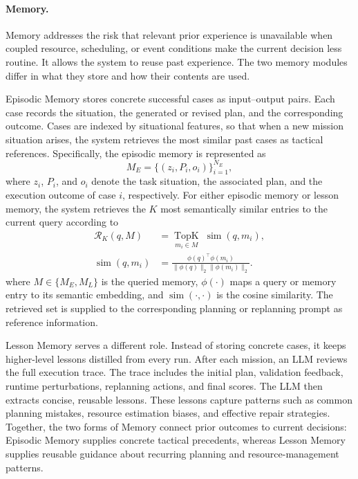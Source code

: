 \paragraph{Memory.} Memory addresses the risk that relevant prior experience is
unavailable when coupled resource, scheduling, or event conditions make the
current decision less routine. It allows the system to reuse past experience.
The two memory modules differ in what they store and how their contents are
used.

Episodic Memory stores concrete successful cases as input--output pairs.
Each case records the situation, the generated or revised plan,
and the corresponding outcome.
Cases are indexed by situational features, so that when a new mission situation arises,
the system retrieves the most similar past cases as tactical references.
Specifically, the episodic memory is represented as
\begin{equation}
M_E=\{(z_i,P_i,o_i)\}_{i=1}^{N_E},
\label{eq:episodic-memory}
\end{equation}
where $z_i$, $P_i$, and $o_i$ denote the task situation, the associated plan,
and the execution outcome of case $i$, respectively. For either episodic
memory or lesson memory, the system retrieves the $K$ most semantically similar
entries to the current query according to
\begin{equation}
\begin{aligned}
\mathcal{R}_K(q,M)
&=\underset{m_i\in M}{\operatorname{TopK}}\;
  \operatorname{sim}(q,m_i),\\
\operatorname{sim}(q,m_i)
&=\frac{\phi(q)^\top\phi(m_i)}
{\lVert\phi(q)\rVert_2\lVert\phi(m_i)\rVert_2}.
\end{aligned}
\label{eq:semantic-memory-retrieval}
\end{equation}
where $M\in\{M_E,M_L\}$ is the queried memory, $\phi(\cdot)$ maps a query
or memory entry to its semantic embedding, and $\operatorname{sim}(\cdot,\cdot)$
is the cosine similarity. The retrieved set is supplied to the corresponding
planning or replanning prompt as reference information.

Lesson Memory serves a different role. Instead of storing concrete cases,
it keeps higher-level lessons distilled from every run.
After each mission, an LLM reviews the full execution trace.
The trace includes the initial plan, validation feedback, runtime perturbations,
replanning actions, and final scores.
The LLM then extracts concise, reusable lessons.
These lessons capture patterns such as common planning mistakes, resource estimation biases,
and effective repair strategies.
Together, the two forms of Memory connect prior outcomes to current decisions:
Episodic Memory supplies concrete tactical precedents, whereas Lesson Memory
supplies reusable guidance about recurring planning and resource-management
patterns.

\endinput
